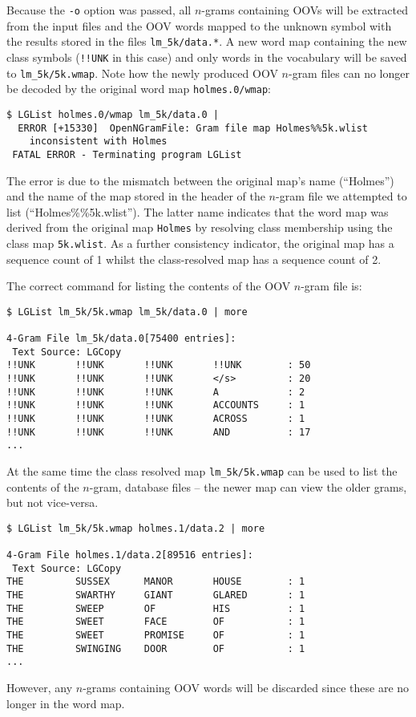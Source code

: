 Because the {\tt -o} option was passed, all $n$-grams containing OOVs
will be extracted from the input files and the OOV words mapped to the
unknown symbol with the results stored in the files
\texttt{lm\_5k/data.*}.  A new word map containing the new class
symbols (\texttt{!!UNK} in this case) and only words in the vocabulary
will be saved to \texttt{lm\_5k/5k.wmap}.  Note how the newly produced
OOV $n$-gram files can no longer be decoded by the original word map
\texttt{holmes.0/wmap}:
\begin{verbatim}
$ LGList holmes.0/wmap lm_5k/data.0 |
  ERROR [+15330]  OpenNGramFile: Gram file map Holmes%%5k.wlist 
	inconsistent with Holmes
 FATAL ERROR - Terminating program LGList
\end{verbatim} %
The error is due to the mismatch between the original map's name
(``Holmes'') and the name of the map stored in the header of the
$n$-gram file we attempted to list (``Holmes\%\%5k.wlist''). The latter
name indicates that the word map was derived from the original map
\texttt{Holmes} by resolving class membership using the class map
\texttt{5k.wlist}.  As a further consistency indicator, the original
map has a sequence count of 1 whilst the class-resolved map has a
sequence count of 2.

The correct command for listing the contents of the OOV $n$-gram
file is:
\begin{verbatim}
$ LGList lm_5k/5k.wmap lm_5k/data.0 | more

4-Gram File lm_5k/data.0[75400 entries]:
 Text Source: LGCopy
!!UNK       !!UNK       !!UNK       !!UNK        : 50
!!UNK       !!UNK       !!UNK       </s>         : 20
!!UNK       !!UNK       !!UNK       A            : 2
!!UNK       !!UNK       !!UNK       ACCOUNTS     : 1
!!UNK       !!UNK       !!UNK       ACROSS       : 1
!!UNK       !!UNK       !!UNK       AND          : 17
...
\end{verbatim} %

At the same time the class resolved map \texttt{lm\_5k/5k.wmap} can
be used to list the contents of the $n$-gram, database files -- the
newer map can view the older grams, but not vice-versa.
\begin{verbatim}
$ LGList lm_5k/5k.wmap holmes.1/data.2 | more

4-Gram File holmes.1/data.2[89516 entries]:
 Text Source: LGCopy
THE         SUSSEX      MANOR       HOUSE        : 1
THE         SWARTHY     GIANT       GLARED       : 1
THE         SWEEP       OF          HIS          : 1
THE         SWEET       FACE        OF           : 1
THE         SWEET       PROMISE     OF           : 1
THE         SWINGING    DOOR        OF           : 1
...
\end{verbatim} %
However, any $n$-grams containing OOV words will be discarded since
these are no longer in the word map.

